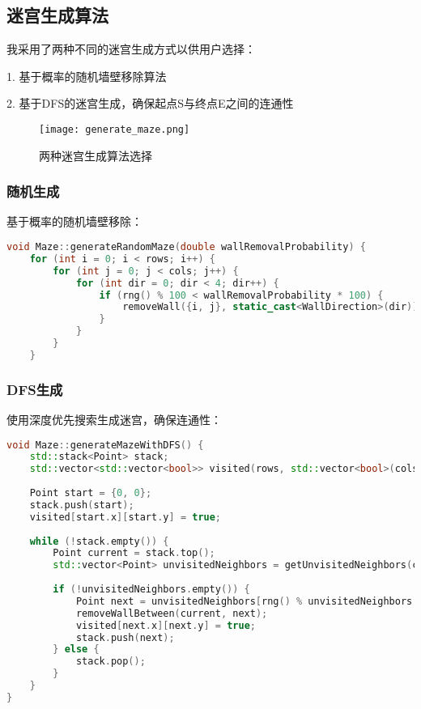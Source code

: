 \documentclass[UTF8]{ctexart}
\begin{document}
\subsection{迷宫生成算法}
我采用了两种不同的迷宫生成方式以供用户选择：

1. 基于概率的随机墙壁移除算法

2. 基于DFS的迷宫生成，确保起点S与终点E之间的连通性

\begin{figure}[h!]
    \centering
    \texttt{[image: generate\_maze.png]}
    \caption{两种迷宫生成算法选择}
    \label{fig:generate}
\end{figure}
\subsubsection{随机生成}
基于概率的随机墙壁移除：
\begin{lstlisting}[language=C++]
void Maze::generateRandomMaze(double wallRemovalProbability) {
    for (int i = 0; i < rows; i++) {
        for (int j = 0; j < cols; j++) {
            for (int dir = 0; dir < 4; dir++) {
                if (rng() % 100 < wallRemovalProbability * 100) {
                    removeWall({i, j}, static_cast<WallDirection>(dir));
                }
            }
        }
    }
\end{lstlisting}

\subsubsection{DFS生成}
使用深度优先搜索生成迷宫，确保连通性：
\begin{lstlisting}[language=C++]
void Maze::generateMazeWithDFS() {
    std::stack<Point> stack;
    std::vector<std::vector<bool>> visited(rows, std::vector<bool>(cols, false));
    
    Point start = {0, 0};
    stack.push(start);
    visited[start.x][start.y] = true;
    
    while (!stack.empty()) {
        Point current = stack.top();
        std::vector<Point> unvisitedNeighbors = getUnvisitedNeighbors(current, visited);
        
        if (!unvisitedNeighbors.empty()) {
            Point next = unvisitedNeighbors[rng() % unvisitedNeighbors.size()];
            removeWallBetween(current, next);
            visited[next.x][next.y] = true;
            stack.push(next);
        } else {
            stack.pop();
        }
    }
}
\end{lstlisting}
\end{document}
